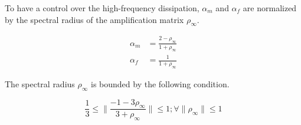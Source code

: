 To have a control over the high-frequency dissipation, $\alpha_m$ and $\alpha_f$ are normalized by the spectral radius of the amplification matrix $\rho_{\infty}$.

\begin{align}
\alpha_m &= \frac{2 - {\rho_{\infty}}}{1 + {\rho_{\infty}}}\\
\alpha_f &= \frac{1}{1 + {\rho_{\infty}}}
\label{eqn:3.93}
\end{align}

The spectral radius $\rho_\infty$ is bounded by the following condition.

\begin{equation}
\frac{1}{3} \leq \lVert{\frac{-1 -3 \rho_{\infty}}{3+ \rho_{\infty}}}\rVert \leq 1; \forall \lVert{\rho_{\infty}}\rVert \leq 1
\label{eqn:3.94}
\end{equation}